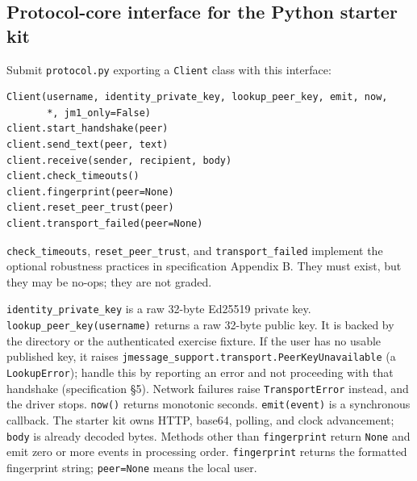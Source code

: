 \documentclass[11pt]{article}
\begin{document}
\subsection*{Protocol-core interface for the Python starter kit}

Submit \texttt{protocol.py} exporting a \texttt{Client} class with this interface:

\begin{small}\begin{verbatim}
Client(username, identity_private_key, lookup_peer_key, emit, now,
       *, jm1_only=False)
client.start_handshake(peer)
client.send_text(peer, text)
client.receive(sender, recipient, body)
client.check_timeouts()
client.fingerprint(peer=None)
client.reset_peer_trust(peer)
client.transport_failed(peer=None)
\end{verbatim}\end{small}

\texttt{check\_timeouts}, \texttt{reset\_peer\_trust}, and \texttt{transport\_failed} implement the optional robustness practices in specification Appendix B. They must exist, but they may be no-ops; they are not graded.

\texttt{identity\_private\_key} is a raw 32-byte Ed25519 private key. \texttt{lookup\_\allowbreak{}peer\_\allowbreak{}key(username)} returns a raw 32-byte public key. It is backed by the directory or the authenticated exercise fixture. If the user has no usable published key, it raises \texttt{jmessage\_\allowbreak{}support.\allowbreak{}transport.\allowbreak{}PeerKeyUnavailable} (a \texttt{LookupError}); handle this by reporting an error and not proceeding with that handshake (specification \S{}5). Network failures raise \texttt{TransportError} instead, and the driver stops. \texttt{now()} returns monotonic seconds. \texttt{emit(event)} is a synchronous callback. The starter kit owns HTTP, base64, polling, and clock advancement; \texttt{body} is already decoded bytes. Methods other than \texttt{fingerprint} return \texttt{None} and emit zero or more events in processing order. \texttt{fingerprint} returns the formatted fingerprint string; \texttt{peer=None} means the local user.
\end{document}
